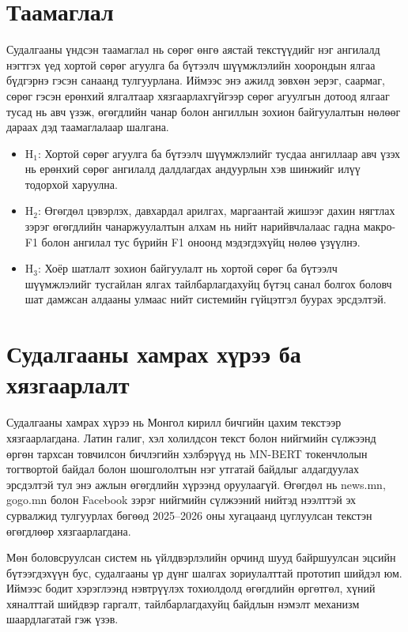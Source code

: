 \section{Таамаглал}

Судалгааны үндсэн таамаглал нь сөрөг өнгө аястай текстүүдийг нэг ангилалд
нэгтгэх үед хортой сөрөг агуулга ба бүтээлч шүүмжлэлийн хоорондын ялгаа
бүдгэрнэ гэсэн санаанд тулгуурлана. Иймээс энэ ажилд зөвхөн эерэг, саармаг,
сөрөг гэсэн ерөнхий ялгалтаар хязгаарлахгүйгээр сөрөг агуулгын дотоод ялгааг
тусад нь авч үзэж, өгөгдлийн чанар болон ангиллын зохион байгуулалтын нөлөөг
дараах дэд таамаглалаар шалгана.

\begin{itemize}
  \item H$_1$: Хортой сөрөг агуулга ба бүтээлч шүүмжлэлийг тусдаа ангиллаар
    авч үзэх нь ерөнхий сөрөг ангилалд далдлагдах андуурлын хэв шинжийг илүү
    тодорхой харуулна.
  \item H$_2$: Өгөгдөл цэвэрлэх, давхардал арилгах, маргаантай жишээг дахин
    нягтлах зэрэг өгөгдлийн чанаржуулалтын алхам нь нийт нарийвчлалаас гадна
    макро-F1 болон ангилал тус бүрийн F1 оноонд мэдэгдэхүйц нөлөө үзүүлнэ.
  \item H$_3$: Хоёр шатлалт зохион байгуулалт нь хортой сөрөг ба бүтээлч
    шүүмжлэлийг тусгайлан ялгах тайлбарлагдахуйц бүтэц санал болгох боловч
    шат дамжсан алдааны улмаас нийт системийн
    гүйцэтгэл буурах эрсдэлтэй.
\end{itemize}

\section{Судалгааны хамрах хүрээ ба хязгаарлалт}

Судалгааны хамрах хүрээ нь Монгол кирилл бичгийн цахим текстээр хязгаарлагдана.
Латин галиг, хэл холилдсон текст болон нийгмийн сүлжээнд өргөн тархсан
товчилсон бичлэгийн хэлбэрүүд нь MN-BERT токенчлолын тогтвортой байдал болон
шошгололтын нэг утгатай байдлыг алдагдуулах эрсдэлтэй тул энэ ажлын өгөгдлийн
хүрээнд оруулаагүй. Өгөгдөл нь news.mn, gogo.mn болон Facebook зэрэг нийгмийн
сүлжээний нийтэд нээлттэй эх сурвалжид тулгуурлах бөгөөд 2025--2026 оны
хугацаанд цуглуулсан текстэн өгөгдлөөр хязгаарлагдана.

Мөн боловсруулсан систем нь үйлдвэрлэлийн орчинд шууд байршуулсан эцсийн
бүтээгдэхүүн бус, судалгааны үр дүнг шалгах зориулалттай прототип шийдэл юм.
Иймээс бодит хэрэглээнд нэвтрүүлэх тохиолдолд өгөгдлийн өргөтгөл, хүний
хяналттай шийдвэр гаргалт, тайлбарлагдахуйц байдлын нэмэлт механизм шаардлагатай
гэж үзэв.

